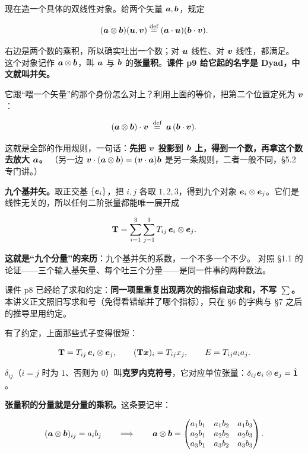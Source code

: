 \documentclass[11pt]{ctexart}
\newcommand{\ten}[1]{\mathbf{#1}}
\newcommand{\unitd}{\hat{\ten{1}}}
\let\origsubhdr\subhdr
\renewcommand{\subhdr}[1]{\par\needspace{3\baselineskip}\origsubhdr{#1}}
\begin{document}

现在造一个具体的双线性对象。给两个矢量 $\boldsymbol{a},\boldsymbol{b}$，规定

\[
(\boldsymbol{a}\otimes\boldsymbol{b})(\boldsymbol{u},\boldsymbol{v})\stackrel{\text{def}}{=}(\boldsymbol{a}\cdot\boldsymbol{u})(\boldsymbol{b}\cdot\boldsymbol{v}).
\]

右边是两个数的乘积，所以确实吐出一个数；对 $\boldsymbol{u}$ 线性、对 $\boldsymbol{v}$ 线性，都满足。
这个对象记作 $\boldsymbol{a}\otimes\boldsymbol{b}$，叫 $\boldsymbol{a}$ 与 $\boldsymbol{b}$ 的\textbf{张量积}。\textbf{课件 p9 给它起的名字是 Dyad，中文就叫并矢。}

它跟“喂一个矢量”的那个身份怎么对上？利用上面的等价，把第二个位置定死为 $\boldsymbol{v}$：

\[
(\boldsymbol{a}\otimes\boldsymbol{b})\cdot\boldsymbol{v}\;\stackrel{\text{def}}{=}\;\boldsymbol{a}\,(\boldsymbol{b}\cdot\boldsymbol{v}).
\]

这就是全部的作用规则，一句话：\textbf{先把 $\boldsymbol{v}$ 投影到 $\boldsymbol{b}$ 上，得到一个数，再拿这个数去放大 $\boldsymbol{a}$。}
（另一边 $\boldsymbol{v}\cdot(\boldsymbol{a}\otimes\boldsymbol{b})=(\boldsymbol{v}\cdot\boldsymbol{a})\boldsymbol{b}$ 是另一条规则，二者一般不同，§5.2 专门讲。）

\textbf{九个基并矢。}取正交基 $\{\boldsymbol{e}_i\}$，把 $i,j$ 各取 $1,2,3$，得到九个对象 $\boldsymbol{e}_i\otimes\boldsymbol{e}_j$。它们是线性无关的，所以任何二阶张量都能唯一展开成

\[
\ten T=\sum_{i=1}^{3}\sum_{j=1}^{3}T_{ij}\,\vect e_i\otimes\vect e_j .
\]

\textbf{这就是“九个分量”的来历}：九个基并矢的系数，一个不多一个不少。
对照 §1.1 的论证——三个输入基矢量、每个吐三个分量——是同一件事的两种数法。


课件 p8 已经给了求和约定：\textbf{同一项里重复出现两次的指标自动求和，不写 $\sum$。}本讲义正文照旧写求和号（免得看错缩并了哪个指标），只在 §6 的字典与 §7 之后的推导里用约定。

有了约定，上面那些式子变得很短：

\[
\ten T=T_{ij}\,\vect e_i\otimes\vect e_j,\qquad
(\ten T\vect x)_i=T_{ij}x_j,\qquad
E=T_{ij}a_ia_j .
\]

$\delta_{ij}$（$i=j$ 时为 $1$、否则为 $0$）叫\textbf{克罗内克符号}，它对应单位张量：$\delta_{ij}\vect e_i\otimes\vect e_j=\unitd$。

\textbf{张量积的分量就是分量的乘积。}这条要记牢：

\[
(\boldsymbol{a}\otimes\boldsymbol{b})_{ij}=a_ib_j
\qquad\Longrightarrow\qquad
\boldsymbol{a}\otimes\boldsymbol{b}=
\begin{pmatrix}
a_1b_1&a_1b_2&a_1b_3\\
a_2b_1&a_2b_2&a_2b_3\\
a_3b_1&a_3b_2&a_3b_3
\end{pmatrix}.
\]
\end{document}
